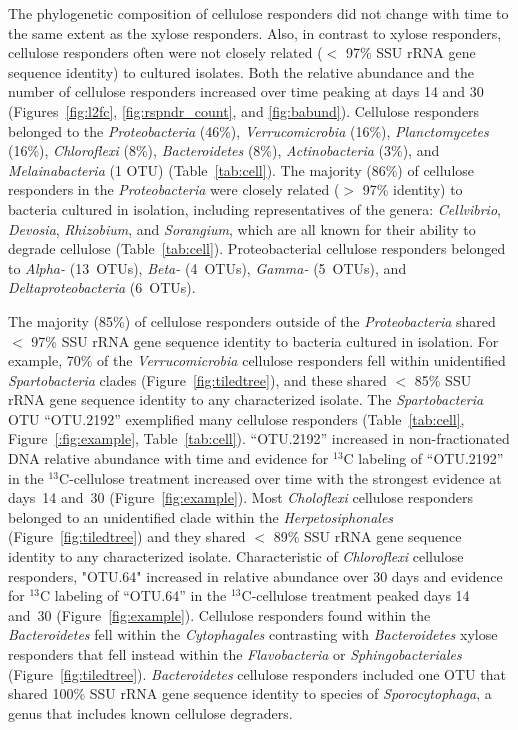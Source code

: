 The phylogenetic composition of cellulose responders did not change with time
to the same extent as the xylose responders. Also, in contrast to xylose
responders, cellulose responders often were not closely related ($<$ 97\% SSU
rRNA gene sequence identity) to cultured isolates. Both the relative abundance
and the number of cellulose responders increased over time peaking at days 14
and 30 (Figures~\ref{fig:l2fc}, \ref{fig:rspndr_count}, and \ref{fig:babund}).
Cellulose responders belonged to the \textit{Proteobacteria} (46\%),
\textit{Verrucomicrobia} (16\%), \textit{Planctomycetes} (16\%),
\textit{Chloroflexi} (8\%), \textit{Bacteroidetes} (8\%),
\textit{Actinobacteria} (3\%), and \textit{Melainabacteria} (1 OTU)
(Table~\ref{tab:cell}). The majority (86\%) of cellulose responders in the
\textit{Proteobacteria} were closely related ($>$ 97\% identity) to bacteria
cultured in isolation, including representatives of the genera:
\textit{Cellvibrio}, \textit{Devosia}, \textit{Rhizobium}, and
\textit{Sorangium}, which are all known for their ability to degrade cellulose
(Table~\ref{tab:cell}). Proteobacterial cellulose responders belonged to
\textit{Alpha-} (13~OTUs), \textit{Beta-} (4~OTUs), \textit{Gamma-} (5~OTUs),
and \textit{Deltaproteobacteria} (6~OTUs). 

The majority (85\%) of cellulose responders outside of the
\textit{Proteobacteria} shared  $<$ 97\% SSU rRNA gene sequence identity to
bacteria cultured in isolation. For example, 70\% of the
\textit{Verrucomicrobia} cellulose responders fell within unidentified
\textit{Spartobacteria} clades (Figure~\ref{fig:tiledtree}), and these shared $<$
85\% SSU rRNA gene sequence identity to any characterized isolate. The
\textit{Spartobacteria} OTU ``OTU.2192'' exemplified many cellulose responders
(Table~\ref{tab:cell}, Figure~\ref{:fig:example}, Table~\ref{tab:cell}).
``OTU.2192'' increased in non-fractionated DNA relative abundance with time and
evidence for $^{13}$C labeling of ``OTU.2192'' in the $^{13}$C-cellulose
treatment increased over time with the strongest evidence at days~14 and~30
(Figure~\ref{fig:example}). Most \textit{Choloflexi} cellulose responders
belonged to an unidentified clade within the \textit{Herpetosiphonales}
(Figure~\ref{fig:tiledtree}) and they shared $<$ 89\% SSU rRNA gene sequence
identity to any characterized isolate. Characteristic of \textit{Chloroflexi}
cellulose responders, "OTU.64" increased in relative abundance over 30 days and
evidence for $^{13}$C labeling of ``OTU.64'' in the $^{13}$C-cellulose
treatment peaked days 14 and~30 (Figure~\ref{fig:example}). Cellulose
responders found within the \textit{Bacteroidetes} fell within the
\textit{Cytophagales} contrasting with \textit{Bacteroidetes} xylose responders
that fell instead within the \textit{Flavobacteria} or
\textit{Sphingobacteriales} (Figure~\ref{fig:tiledtree}).
\textit{Bacteroidetes} cellulose responders included one OTU that shared 100\%
SSU rRNA gene sequence identity to species of \textit{Sporocytophaga}, a genus
that includes known cellulose degraders.

